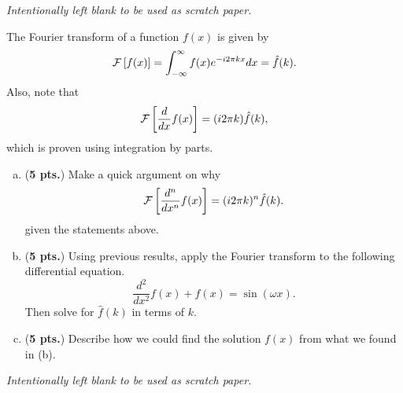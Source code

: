 \documentclass[12pt]{amsbook}
\begin{document}
\newpage
\emph{Intentionally left blank to be used as scratch paper.}\\


\newpage
\begin{problem}
The Fourier transform of a function $f(x)$ is given by
\[
\mathcal{F}\left[ f(x) \right]=\int_{-\infty}^\infty f(x) e^{-i2\pi kx}dx = \hat{f}(k).
\]
Also, note that 
\[
\mathcal{F}\left[ \frac{d}{dx}f(x) \right] = (i2\pi k) \hat{f}(k),
\]
which is proven using integration by parts.

\begin{enumerate}[(a)]
	\item (\textbf{5 pts.}) Make a quick argument on why 
	\[
	\mathcal{F}\left[ \frac{d^n}{dx^n}f(x) \right] = (i2\pi k)^n \hat{f}(k).
	\]
	given the statements above.
	\vspace*{4cm}
	
	\item (\textbf{5 pts.}) Using previous results, apply the Fourier transform to the following differential equation.
	\[
	\frac{d^2}{dx^2}f(x)  + f(x) = \sin(\omega x).
	\]
	Then solve for $\hat{f}(k)$ in terms of $k$.
	\vspace*{5cm}
	
	\item (\textbf{5 pts.}) Describe how we could find the solution $f(x)$ from what we found in (b).
\end{enumerate}
\end{problem}
\newpage
\emph{Intentionally left blank to be used as scratch paper.}\\
\end{document}
